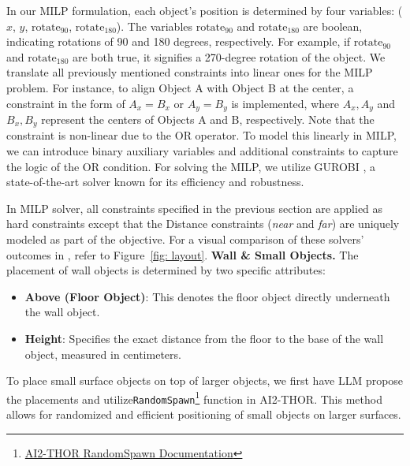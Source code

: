 In our MILP formulation, each object's position is determined by four variables: ($x$, $y$, $\text{rotate}_{90}$, $\text{rotate}_{180}$). The variables $\text{rotate}_{90}$ and $\text{rotate}_{180}$ are boolean, indicating rotations of 90 and 180 degrees, respectively. For example, if $\text{rotate}_{90}$ and $\text{rotate}_{180}$ are both true, it signifies a 270-degree rotation of the object.
We translate all previously mentioned constraints into linear ones for the MILP problem. For instance, to align Object A with Object B at the center, a constraint in the form of \(A_x = B_x\) or \(A_y = B_y\) is implemented, where \(A_x, A_y\) and \(B_x, B_y\) represent the centers of Objects A and B, respectively. Note that the constraint is non-linear due to the OR operator. To model this linearly in MILP, we can introduce binary auxiliary variables and additional constraints to capture the logic of the OR condition.
For solving the MILP, we utilize GUROBI \cite{gurobi}, a state-of-the-art solver known for its efficiency and robustness. 

In MILP solver, all constraints specified in the previous section are applied as hard constraints except that the Distance constraints (\textit{near} and \textit{far}) are uniquely modeled as part of the objective. For a visual comparison of these solvers' outcomes in \holodeck, refer to Figure~\ref{fig: layout}.
\smallbreak
\noindent \textbf{Wall \& Small Objects.} The placement of wall objects is determined by two specific attributes:
\begin{itemize}
\item \textbf{Above (Floor Object)}: This denotes the floor object directly underneath the wall object.
\item \textbf{Height}: Specifies the exact distance from the floor to the base of the wall object, measured in centimeters.
\end{itemize}

To place small surface objects on top of larger objects, we first have LLM propose the placements and utilize\texttt{RandomSpawn}\footnote{\href{https://ai2thor.allenai.org/ithor/documentation/objects/domain-randomization/\#initial-random-spawn}{AI2-THOR RandomSpawn Documentation}} function in AI2-THOR. This method allows for randomized and efficient positioning of small objects on larger surfaces.

